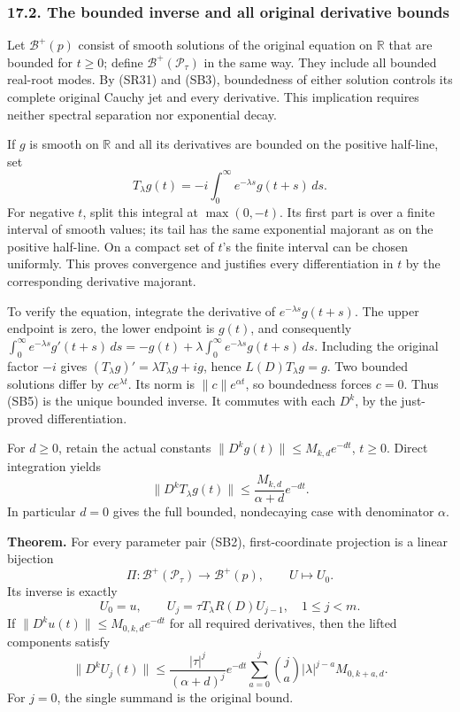 \documentclass[
  11pt,
]{article}
\begin{document}
\subsubsection{17.2. The bounded inverse and all original derivative
bounds}\label{the-bounded-inverse-and-all-original-derivative-bounds}

Let \(\mathcal B^+(p)\) consist of smooth solutions of the original
equation on \(\mathbb R\) that are bounded for \(t\geq0\); define
\(\mathcal B^+(\mathcal P_\tau)\) in the same way. They include all
bounded real-root modes. By (SR31) and (SB3), boundedness of either
solution controls its complete original Cauchy jet and every derivative.
This implication requires neither spectral separation nor exponential
decay.

If \(g\) is smooth on \(\mathbb R\) and all its derivatives are bounded
on the positive half-line, set \[
 T_\lambda g(t)=-i\int_0^\infty e^{-\lambda s}g(t+s)\,ds.
 \tag{SB5}
\] For negative \(t\), split this integral at \(\max(0,-t)\). Its first
part is over a finite interval of smooth values; its tail has the same
exponential majorant as on the positive half-line. On a compact set of
\(t\)'s the finite interval can be chosen uniformly. This proves
convergence and justifies every differentiation in \(t\) by the
corresponding derivative majorant.

To verify the equation, integrate the derivative of
\(e^{-\lambda s}g(t+s)\). The upper endpoint is zero, the lower endpoint
is \(g(t)\), and consequently \(\int_0^\infty e^{-\lambda s}g'(t+s)\,ds
 =-g(t)+\lambda\int_0^\infty e^{-\lambda s}g(t+s)\,ds\). Including the
original factor \(-i\) gives \((T_\lambda g)'=\lambda T_\lambda g+ig\),
hence \(L(D)T_\lambda g=g\). Two bounded solutions differ by
\(ce^{\lambda t}\). Its norm is \(\|c\|e^{\alpha t}\), so boundedness
forces \(c=0\). Thus (SB5) is the unique bounded inverse. It commutes
with each \(D^k\), by the just-proved differentiation.

For \(d\geq0\), retain the actual constants
\(\|D^kg(t)\|\leq M_{k,d}e^{-dt}\), \(t\geq0\). Direct integration
yields \[
 \|D^kT_\lambda g(t)\|
       \leq\frac{M_{k,d}}{\alpha+d}e^{-dt}.
 \tag{SB6}
\] In particular \(d=0\) gives the full bounded, nondecaying case with
denominator \(\alpha\).

\textbf{Theorem.} For every parameter pair (SB2), first-coordinate
projection is a linear bijection \[
 \Pi:\mathcal B^+(\mathcal P_\tau)\longrightarrow\mathcal B^+(p),
 \qquad U\longmapsto U_0.
 \tag{SB7}
\] Its inverse is exactly \[
 U_0=u,\qquad U_j=\tau T_\lambda R(D)U_{j-1},\quad 1\leq j<m.
 \tag{SB8}
\] If \(\|D^ku(t)\|\leq M_{0,k,d}e^{-dt}\) for all required derivatives,
then the lifted components satisfy \[
 \|D^kU_j(t)\|\leq
 \frac{|\tau|^j}{(\alpha+d)^j}e^{-dt}
 \sum_{a=0}^j\binom ja |\lambda|^{j-a}M_{0,k+a,d}.
 \tag{SB9}
\] For \(j=0\), the single summand is the original bound.
\end{document}
